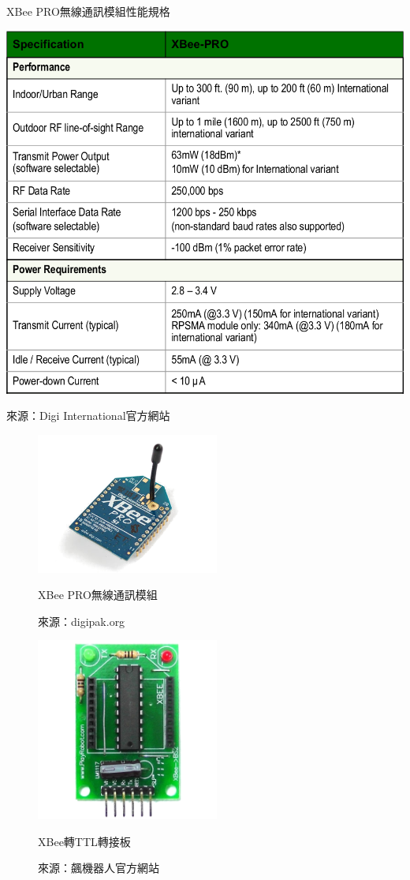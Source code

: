 \begin{table}[h!]
	\centering
	\caption{XBee PRO無線通訊模組性能規格}
	\label{t:xbee_pro}
	\includegraphics[width=\textwidth]{tables/XBee_PRO}
	\caption*{來源：Digi International官方網站}
\end{table}

\begin{figure}[h!]
	\centering
	\includegraphics[width=6cm]{figures/xbee_pro}
	\caption{XBee PRO無線通訊模組}
	\caption{來源：digipak.org}
	\label{f:xbee_pro}
\end{figure}

\begin{figure}[h!]
	\centering
	\includegraphics[width=6cm]{figures/xbee2ttl}
	\caption{XBee轉TTL轉接板}
	\caption*{來源：飆機器人官方網站}
	\label{f:xbee2ttl}
\end{figure}

